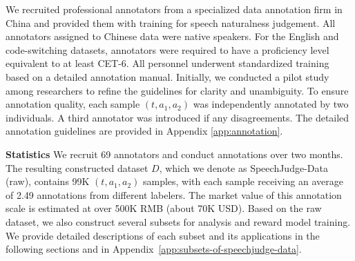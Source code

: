 \documentclass[]{bytedance_seed}
\begin{document}
We recruited professional annotators from a specialized data annotation firm in China and provided them with training for speech naturalness judgement.  
All annotators assigned to Chinese data were native speakers. 
For the English and code-switching datasets, annotators were required to have a proficiency level equivalent to at least CET-6. All personnel underwent standardized training based on a detailed annotation manual. Initially, we conducted a pilot study among researchers to refine the guidelines for clarity and unambiguity. To ensure annotation quality, each sample $(t, a_1, a_2)$  was independently annotated by two individuals. A third annotator was introduced if any disagreements. The detailed annotation guidelines are provided in Appendix \ref{app:annotation}.

\textbf{Statistics}\quad
We recruit 69 annotators and conduct annotations over two months. The resulting constructed dataset $D$, which we denote as SpeechJudge-Data (raw), contains 99K $(t, a_1, a_2)$ samples, with each sample receiving an average of 2.49 annotations from different labelers. The market value of this annotation scale is estimated at over 500K RMB (about 70K USD). Based on the raw dataset, we also construct several subsets for analysis and reward model training. We provide detailed descriptions of each subset and its applications in the following sections and in Appendix~\ref{app:subsets-of-speechjudge-data}.

\end{document}
